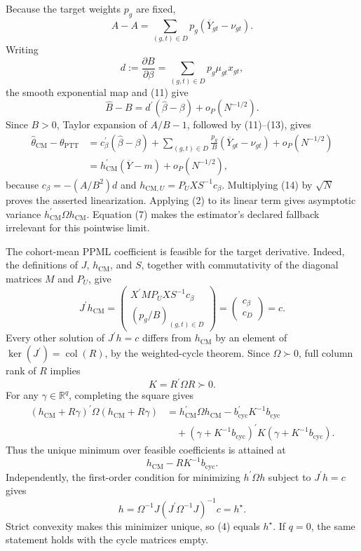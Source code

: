 Because the target weights \(p_g\) are fixed,
\[
\widehat A-A
=\sum_{(g,t)\in D}p_g(\overline Y_{gt}-\nu_{gt}).                      \tag{12}
\]
Writing
\[
d:=\frac{\partial B}{\partial\beta}
=\sum_{(g,t)\in D}p_g\mu_{gt}x_{gt},
\]
the smooth exponential map and (11) give
\[
\widehat B-B=d^{\prime}(\widehat\beta-\beta)+o_P(N^{-1/2}).            \tag{13}
\]
Since \(B>0\), Taylor expansion of \(A/B-1\), followed by (11)--(13), gives
\[
\begin{aligned}
\widehat\theta_{\mathrm{CM}}-\theta_{\mathrm{PTT}}
&=c_\beta^{\prime}(\widehat\beta-\beta)
 +\sum_{(g,t)\in D}\frac{p_g}{B}(\overline Y_{gt}-\nu_{gt})
 +o_P(N^{-1/2})\\
&=h_{\mathrm{CM}}^{\prime}(\overline Y-m)+o_P(N^{-1/2}),               \tag{14}
\end{aligned}
\]
because \(c_\beta=-(A/B^2)d\) and
\(h_{\mathrm{CM},U}=P_UXS^{-1}c_\beta\).  Multiplying (14) by \(\sqrt N\) proves the asserted linearization.  Applying (2) to its linear term gives asymptotic variance
\(h_{\mathrm{CM}}^{\prime}\Omega h_{\mathrm{CM}}\).  Equation (7) makes the estimator's declared fallback irrelevant for this pointwise limit.

The cohort-mean PPML coefficient is feasible for the target derivative.  Indeed, the definitions of \(J\), \(h_{\mathrm{CM}}\), and \(S\), together with commutativity of the diagonal matrices \(M\) and \(P_U\), give
\[
J^{\prime}h_{\mathrm{CM}}
=\begin{pmatrix}
X^{\prime}MP_UXS^{-1}c_\beta\\
(p_g/B)_{(g,t)\in D}
\end{pmatrix}
=\begin{pmatrix}c_\beta\\c_D\end{pmatrix}
=c.                                                                      \tag{1}
\]
Every other solution of \(J^{\prime}h=c\) differs from \(h_{\mathrm{CM}}\) by an element of \(\ker(J^{\prime})=\operatorname{col}(R)\), by the weighted-cycle theorem.  Since \(\Omega\succ0\), full column rank of \(R\) implies
\[
K=R^{\prime}\Omega R\succ0.                                            \tag{2}
\]
For any \(\gamma\in\mathbb R^q\), completing the square gives
\[
\begin{aligned}
(h_{\mathrm{CM}}+R\gamma)^{\prime}\Omega(h_{\mathrm{CM}}+R\gamma)
&=h_{\mathrm{CM}}^{\prime}\Omega h_{\mathrm{CM}}
 -b_{\mathrm{cyc}}^{\prime}K^{-1}b_{\mathrm{cyc}}\\
&\quad+(\gamma+K^{-1}b_{\mathrm{cyc}})^{\prime}
 K(\gamma+K^{-1}b_{\mathrm{cyc}}).                                    \tag{3}
\end{aligned}
\]
Thus the unique minimum over feasible coefficients is attained at
\[
h_{\mathrm{CM}}-RK^{-1}b_{\mathrm{cyc}}.                               \tag{4}
\]
Independently, the first-order condition for minimizing \(h^{\prime}\Omega h\) subject to \(J^{\prime}h=c\) gives
\[
h=\Omega^{-1}J(J^{\prime}\Omega^{-1}J)^{-1}c=h^{\star}.                \tag{5}
\]
Strict convexity makes this minimizer unique, so (4) equals \(h^{\star}\).  If \(q=0\), the same statement holds with the cycle matrices empty.

